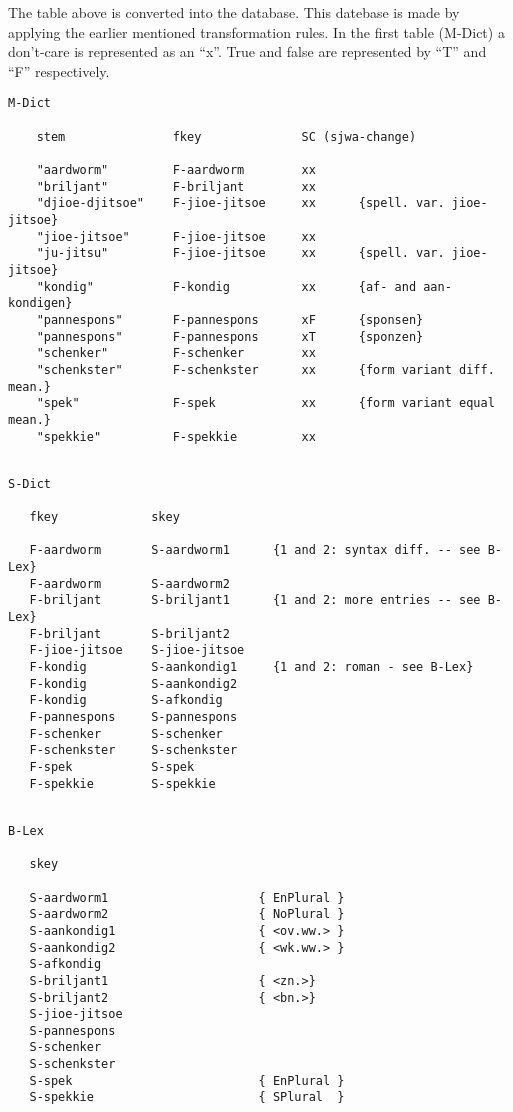 \vspace{3mm}
The table above is converted into the database. This datebase is made by 
applying the 
earlier mentioned transformation rules. In the first table (M-Dict) 
a don't-care is represented as an ``x''. True and false are represented by 
``T'' and ``F'' respectively. 
 
\begin{verbatim}
M-Dict
    
    stem               fkey              SC (sjwa-change)
 
    "aardworm"         F-aardworm        xx
    "briljant"         F-briljant        xx
    "djioe-djitsoe"    F-jioe-jitsoe     xx      {spell. var. jioe-jitsoe}
    "jioe-jitsoe"      F-jioe-jitsoe     xx
    "ju-jitsu"         F-jioe-jitsoe     xx      {spell. var. jioe-jitsoe}
    "kondig"           F-kondig          xx      {af- and aan-kondigen}
    "pannespons"       F-pannespons      xF      {sponsen}
    "pannespons"       F-pannespons      xT      {sponzen}
    "schenker"         F-schenker        xx
    "schenkster"       F-schenkster      xx      {form variant diff. mean.}
    "spek"             F-spek            xx      {form variant equal mean.}
    "spekkie"          F-spekkie         xx
\end{verbatim}
\begin{verbatim}
 
S-Dict
    
   fkey             skey
    
   F-aardworm       S-aardworm1      {1 and 2: syntax diff. -- see B-Lex}
   F-aardworm       S-aardworm2
   F-briljant       S-briljant1      {1 and 2: more entries -- see B-Lex}
   F-briljant       S-briljant2
   F-jioe-jitsoe    S-jioe-jitsoe 
   F-kondig         S-aankondig1     {1 and 2: roman - see B-Lex}
   F-kondig         S-aankondig2
   F-kondig         S-afkondig
   F-pannespons     S-pannespons
   F-schenker       S-schenker
   F-schenkster     S-schenkster
   F-spek           S-spek
   F-spekkie        S-spekkie
\end{verbatim}
\begin{verbatim}
 
B-Lex
    
   skey
    
   S-aardworm1                     { EnPlural }
   S-aardworm2                     { NoPlural }
   S-aankondig1                    { <ov.ww.> }
   S-aankondig2                    { <wk.ww.> }
   S-afkondig
   S-briljant1                     { <zn.>}
   S-briljant2                     { <bn.>}
   S-jioe-jitsoe
   S-pannespons
   S-schenker
   S-schenkster
   S-spek                          { EnPlural }
   S-spekkie                       { SPlural  }
\end{verbatim}
